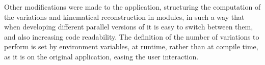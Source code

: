 Other modifications were made to the application, structuring the computation of the variations and kinematical reconstruction in modules, in such a way that when developing different parallel versions of \ttDilepKinFit it is easy to switch between them, and also increasing code readability. The definition of the number of variations to perform is set by environment variables, at runtime, rather than at compile time, as it is on the original application, easing the user interaction.
